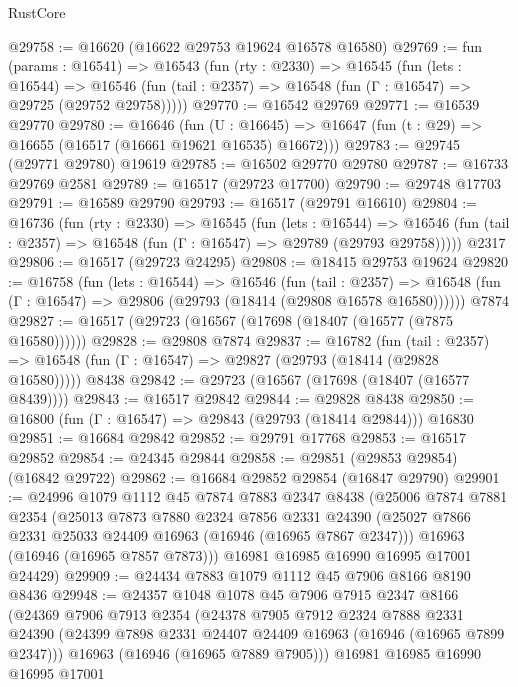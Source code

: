 \begin{lexlean}{RustCore}
\begin{coremodule}
@29758 := @16620 (@16622 @29753 @19624 @16578 @16580)
@29769 := fun (params : @16541) =>
  @16543
    (fun (rty : @2330) =>
    @16545
      (fun (lets : @16544) =>
      @16546 (fun (tail : @2357) => @16548 (fun (Γ : @16547) => @29725 (@29752 @29758)))))
@29770 := @16542 @29769
@29771 := @16539 @29770
@29780 := @16646
    (fun (U : @16645) => @16647 (fun (t : @29) => @16655 (@16517 (@16661 @19621 @16535) @16672)))
@29783 := @29745 (@29771 @29780) @19619
@29785 := @16502 @29770 @29780
@29787 := @16733 @29769 @2581
@29789 := @16517 (@29723 @17700)
@29790 := @29748 @17703
@29791 := @16589 @29790
@29793 := @16517 (@29791 @16610)
@29804 := @16736
    (fun (rty : @2330) =>
    @16545
      (fun (lets : @16544) =>
      @16546 (fun (tail : @2357) => @16548 (fun (Γ : @16547) => @29789 (@29793 @29758)))))
    @2317
@29806 := @16517 (@29723 @24295)
@29808 := @18415 @29753 @19624
@29820 := @16758
    (fun (lets : @16544) =>
    @16546
      (fun (tail : @2357) =>
      @16548 (fun (Γ : @16547) => @29806 (@29793 (@18414 (@29808 @16578 @16580))))))
    @7874
@29827 := @16517 (@29723 (@16567 (@17698 (@18407 (@16577 (@7875 @16580))))))
@29828 := @29808 @7874
@29837 := @16782
    (fun (tail : @2357) => @16548 (fun (Γ : @16547) => @29827 (@29793 (@18414 (@29828 @16580)))))
    @8438
@29842 := @29723 (@16567 (@17698 (@18407 (@16577 @8439))))
@29843 := @16517 @29842
@29844 := @29828 @8438
@29850 := @16800 (fun (Γ : @16547) => @29843 (@29793 (@18414 @29844))) @16830
@29851 := @16684 @29842
@29852 := @29791 @17768
@29853 := @16517 @29852
@29854 := @24345 @29844
@29858 := @29851 (@29853 @29854) (@16842 @29722)
@29862 := @16684 @29852 @29854 (@16847 @29790)
@29901 := @24996
    @1079
    @1112
    @45
    @7874
    @7883
    @2347
    @8438
    (@25006
      @7874
      @7881
      @2354
      (@25013
        @7873
        @7880
        @2324
        @7856
        @2331
        @24390
        (@25027 @7866 @2331 @25033 @24409 @16963 (@16946 (@16965 @7867 @2347)))
        @16963
        (@16946 (@16965 @7857 @7873)))
      @16981
      @16985
      @16990
      @16995
      @17001
      @24429)
@29909 := @24434 @7883 @1079 @1112 @45 @7906 @8166 @8190 @8436
@29948 := @24357
    @1048
    @1078
    @45
    @7906
    @7915
    @2347
    @8166
    (@24369
      @7906
      @7913
      @2354
      (@24378
        @7905
        @7912
        @2324
        @7888
        @2331
        @24390
        (@24399 @7898 @2331 @24407 @24409 @16963 (@16946 (@16965 @7899 @2347)))
        @16963
        (@16946 (@16965 @7889 @7905)))
      @16981
      @16985
      @16990
      @16995
      @17001

\end{coremodule}
\end{lexlean}
